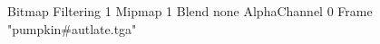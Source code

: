 {Bitmap
	{Filtering 1}
	{Mipmap 1}
	{Blend none}
	{AlphaChannel 0}
	{Frame "pumpkin#autlate.tga"}
}
